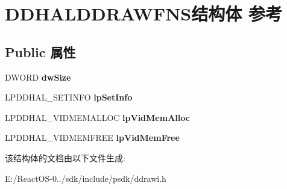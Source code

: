\hypertarget{struct_d_d_h_a_l_d_d_r_a_w_f_n_s}{}\section{D\+D\+H\+A\+L\+D\+D\+R\+A\+W\+F\+N\+S结构体 参考}
\label{struct_d_d_h_a_l_d_d_r_a_w_f_n_s}
\subsection*{Public 属性}
\begin{DoxyCompactItemize}
\item 
\mbox{\label{struct_d_d_h_a_l_d_d_r_a_w_f_n_s_a8ce4501f653ce69519ecb0b4422babac}} 
D\+W\+O\+RD {\bfseries dw\+Size}
\item 
\mbox{\label{struct_d_d_h_a_l_d_d_r_a_w_f_n_s_abba9eed3a666ad65c97e8990224d5115}} 
L\+P\+D\+D\+H\+A\+L\+\_\+\+S\+E\+T\+I\+N\+FO {\bfseries lp\+Set\+Info}
\item 
\mbox{\label{struct_d_d_h_a_l_d_d_r_a_w_f_n_s_a71260aa4fe617fd754e4770bb4ce9c66}} 
L\+P\+D\+D\+H\+A\+L\+\_\+\+V\+I\+D\+M\+E\+M\+A\+L\+L\+OC {\bfseries lp\+Vid\+Mem\+Alloc}
\item 
\mbox{\label{struct_d_d_h_a_l_d_d_r_a_w_f_n_s_a9bfbf333e729b2491d283dd6c150040e}} 
L\+P\+D\+D\+H\+A\+L\+\_\+\+V\+I\+D\+M\+E\+M\+F\+R\+EE {\bfseries lp\+Vid\+Mem\+Free}
\end{DoxyCompactItemize}


该结构体的文档由以下文件生成\+:\begin{DoxyCompactItemize}
\item 
E\+:/\+React\+O\+S-\/0../sdk/include/psdk/ddrawi.\+h\end{DoxyCompactItemize}
